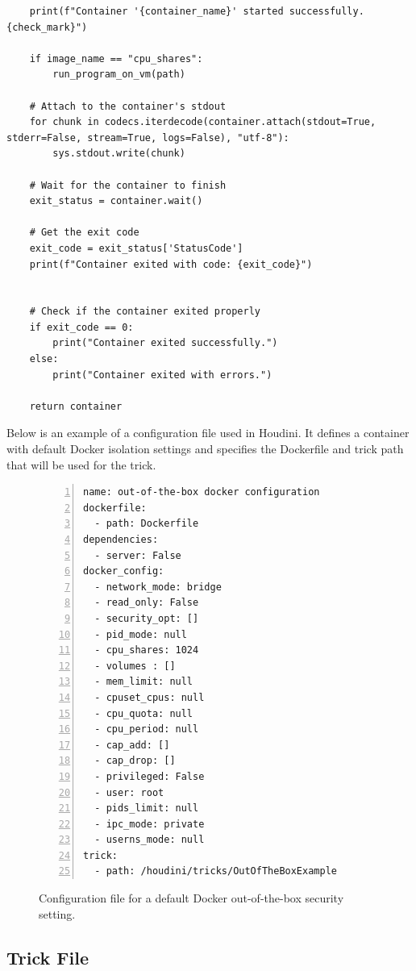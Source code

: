 \documentclass[12pt]{report}
\begin{document}
\begin{doublespace}
\begin{lstlisting}
    print(f"Container '{container_name}' started successfully. {check_mark}")

    if image_name == "cpu_shares":
        run_program_on_vm(path)

    # Attach to the container's stdout
    for chunk in codecs.iterdecode(container.attach(stdout=True, stderr=False, stream=True, logs=False), "utf-8"):
        sys.stdout.write(chunk)

    # Wait for the container to finish
    exit_status = container.wait()
    
    # Get the exit code
    exit_code = exit_status['StatusCode']
    print(f"Container exited with code: {exit_code}")
    

    # Check if the container exited properly
    if exit_code == 0:
        print("Container exited successfully.")
    else:
        print("Container exited with errors.")

    return container
\end{lstlisting}


Below is an example of a configuration file used in Houdini. It defines a container with default Docker isolation settings and specifies the Dockerfile and trick path that will be used for the trick.

\begin{figure}[H]
\caption{Configuration file for a default Docker out-of-the-box security setting.}
\label{fig:configuration-file}
\begin{lstlisting}[caption={}, numbers=left, numberstyle=\tiny, stepnumber=1, breaklines=true, frame=single, backgroundcolor=\color{gray!10}, basicstyle=\ttfamily\scriptsize, showspaces=false, showstringspaces=false]
name: out-of-the-box docker configuration
dockerfile:
  - path: Dockerfile
dependencies:
  - server: False
docker_config: 
  - network_mode: bridge
  - read_only: False
  - security_opt: []
  - pid_mode: null
  - cpu_shares: 1024
  - volumes : []
  - mem_limit: null
  - cpuset_cpus: null
  - cpu_quota: null
  - cpu_period: null
  - cap_add: []
  - cap_drop: []
  - privileged: False
  - user: root
  - pids_limit: null
  - ipc_mode: private
  - userns_mode: null
trick:
  - path: /houdini/tricks/OutOfTheBoxExample
\end{lstlisting}
\end{figure}




\subsection{Trick File}
\label{sec:trick_file}


\end{doublespace}
\end{document}
